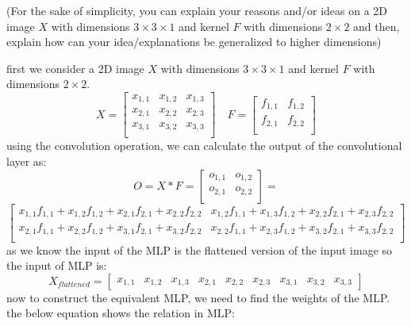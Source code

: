 (For the sake of simplicity, you can explain your reasons and/or ideas on a 2D image \(X\) with dimensions \(3 \times 3 \times 1\) and kernel \(F\) with dimensions \(2 \times 2\) and then, explain how can your idea/explanations be generalized to higher dimensions)
\begin{qsolve}
    \begin{qsolve}[]
        first we consider a 2D image \(X\) with dimensions \(3 \times 3 \times 1\) and kernel \(F\) with dimensions \(2 \times 2\).
        \[
            X = \begin{bmatrix}
                x_{1,1} & x_{1,2} & x_{1,3} \\
                x_{2,1} & x_{2,2} & x_{2,3} \\
                x_{3,1} & x_{3,2} & x_{3,3} \\
            \end{bmatrix} \quad
            F = \begin{bmatrix}
                f_{1,1} & f_{1,2} \\
                f_{2,1} & f_{2,2} \\
            \end{bmatrix}
        \]
        using the convolution operation, we can calculate the output of the convolutional layer as:
        $$
            O = X * F = \begin{bmatrix}
                o_{1,1} & o_{1,2} \\
                o_{2,1} & o_{2,2} \\
            \end{bmatrix} = 
        $$
        $$
            \begin{bmatrix}
                x_{1,1}f_{1,1} + x_{1,2}f_{1,2} + x_{2,1}f_{2,1} + x_{2,2}f_{2,2} & x_{1,2}f_{1,1} + x_{1,3}f_{1,2} + x_{2,2}f_{2,1} + x_{2,3}f_{2,2} \\
                x_{2,1}f_{1,1} + x_{2,2}f_{1,2} + x_{3,1}f_{2,1} + x_{3,2}f_{2,2} & x_{2,2}f_{1,1} + x_{2,3}f_{1,2} + x_{3,2}f_{2,1} + x_{3,3}f_{2,2} \\
            \end{bmatrix}
        $$
        as we know the input of the MLP is the flattened version of the input image so the input of MLP is:
        $$
            X_{flattened} = \begin{bmatrix}
                x_{1,1} & x_{1,2} & x_{1,3} & x_{2,1} & x_{2,2} & x_{2,3} & x_{3,1} & x_{3,2} & x_{3,3}
            \end{bmatrix}
        $$
        now to construct the equivalent MLP, we need to find the weights of the MLP. the below equation shows the relation in MLP:

\end{qsolve}
\end{qsolve}
